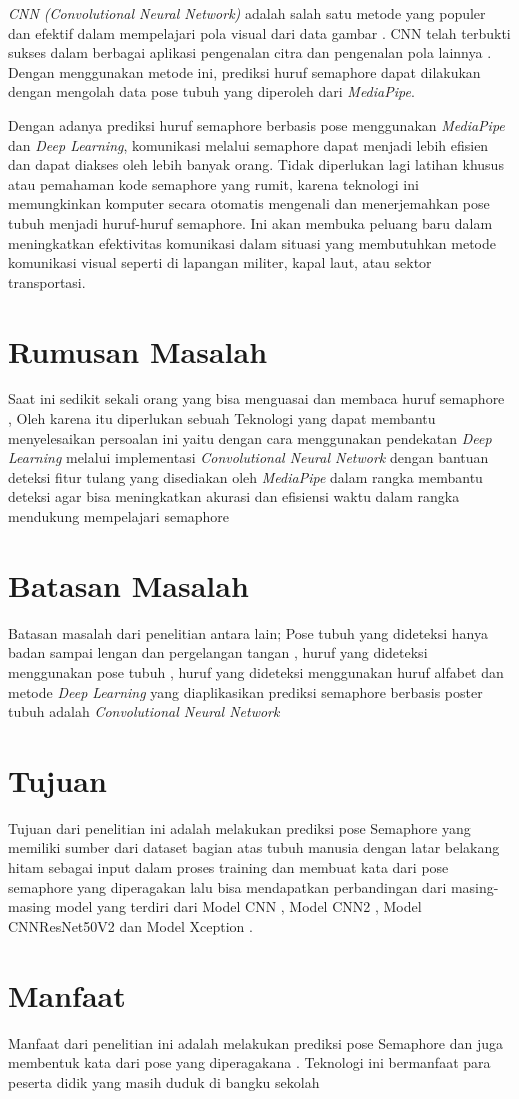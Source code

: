 \textit{CNN (Convolutional Neural Network)} adalah salah satu metode yang populer dan efektif dalam mempelajari pola visual dari data gambar \cite{lecun2015deep}. CNN telah terbukti sukses dalam berbagai aplikasi pengenalan citra dan pengenalan pola lainnya \cite{kim2023human}. Dengan menggunakan metode ini, prediksi huruf semaphore dapat dilakukan dengan mengolah data pose tubuh yang diperoleh dari \textit{MediaPipe}. 

Dengan adanya prediksi huruf semaphore berbasis pose menggunakan \textit{MediaPipe} dan \textit{Deep Learning}, komunikasi melalui semaphore dapat menjadi lebih efisien dan dapat diakses oleh lebih banyak orang. Tidak diperlukan lagi latihan khusus atau pemahaman kode semaphore yang rumit, karena teknologi ini memungkinkan komputer secara otomatis mengenali dan menerjemahkan pose tubuh menjadi huruf-huruf semaphore. Ini akan membuka peluang baru dalam meningkatkan efektivitas komunikasi dalam situasi yang membutuhkan metode komunikasi visual seperti di lapangan militer, kapal laut, atau sektor transportasi.


\section{Rumusan Masalah}
Saat ini sedikit sekali orang yang bisa menguasai dan membaca huruf semaphore , Oleh karena itu diperlukan sebuah Teknologi yang dapat membantu  menyelesaikan persoalan ini yaitu dengan cara menggunakan pendekatan \textit{Deep Learning} melalui implementasi \textit{Convolutional Neural Network} dengan bantuan deteksi fitur tulang yang disediakan oleh \textit{MediaPipe} dalam rangka membantu deteksi agar bisa meningkatkan akurasi dan efisiensi waktu dalam rangka mendukung mempelajari semaphore 

\section{Batasan Masalah}
Batasan masalah dari penelitian antara lain; Pose tubuh yang dideteksi hanya badan sampai lengan dan pergelangan tangan , huruf yang dideteksi menggunakan pose tubuh , huruf yang dideteksi menggunakan huruf alfabet dan metode  \textit{Deep Learning} yang diaplikasikan prediksi semaphore berbasis poster tubuh adalah \textit{Convolutional Neural Network}
 

\section{Tujuan}
Tujuan dari penelitian ini adalah melakukan prediksi pose Semaphore yang memiliki sumber dari dataset bagian atas tubuh manusia dengan latar belakang hitam sebagai input dalam proses training dan membuat kata dari pose semaphore yang diperagakan lalu bisa mendapatkan perbandingan dari masing-masing model yang terdiri dari Model CNN , Model CNN2 , Model CNNResNet50V2 dan Model Xception . 

\section{Manfaat}
Manfaat dari penelitian ini adalah melakukan prediksi pose Semaphore dan juga membentuk kata dari pose yang diperagakana . Teknologi ini bermanfaat para peserta didik yang masih duduk di bangku sekolah